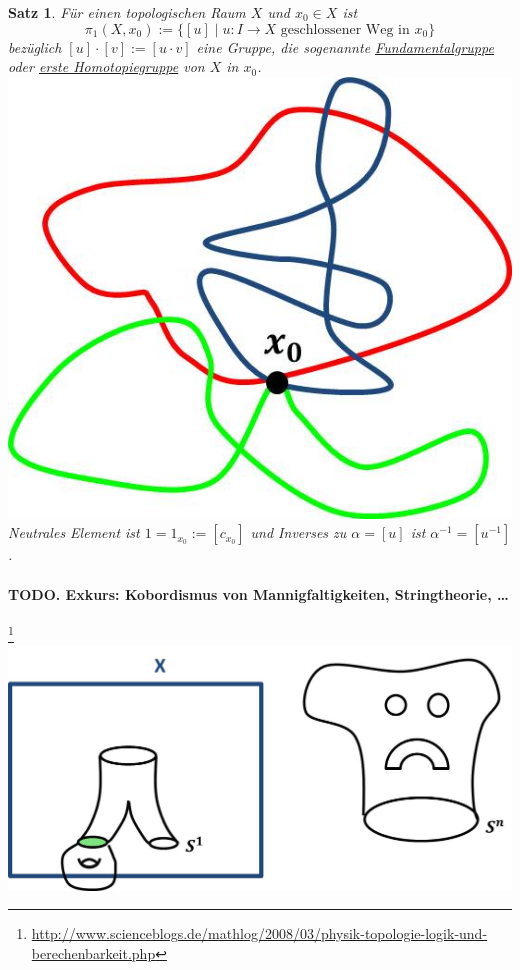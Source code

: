 \documentclass[a4paper,11pt,notitlepage]{report}
\newtheorem{theorem}{Satz}[chapter]
\theoremstyle{remark}
\theoremstyle{definition}
\begin{document}
\begin{theorem}{}
	Für einen topologischen Raum $X$ und $x_0 \in X$ ist 
	$$\pi_1 (X,x_0) := \{ [u] \mid u \colon I \rightarrow X \text{ geschlossener Weg in } x_0 \}$$
	bezüglich $[u] \cdot [v] := [u \cdot v]$ eine Gruppe, die sogenannte \underline{Fundamentalgruppe} oder \underline{erste Homotopiegruppe} von $X$ in $x_0$. \includegraphics[scale=0.4]{images/Fundamentalgruppe.jpg}
	\newline
	Neutrales Element ist $1 = 1_{x_0} := [c_{x_0}]$ \newline und Inverses zu $\alpha = [u]$ ist $\alpha^{-1} = [u^{-1}]$.
\end{theorem}

\paragraph{TODO. Exkurs: Kobordismus von Mannigfaltigkeiten, Stringtheorie, \ldots}\footnote{\url{http://www.scienceblogs.de/mathlog/2008/03/physik-topologie-logik-und-berechenbarkeit.php}} \includegraphics[scale=0.4]{images/Kobordismus.jpg} 
\end{document}
